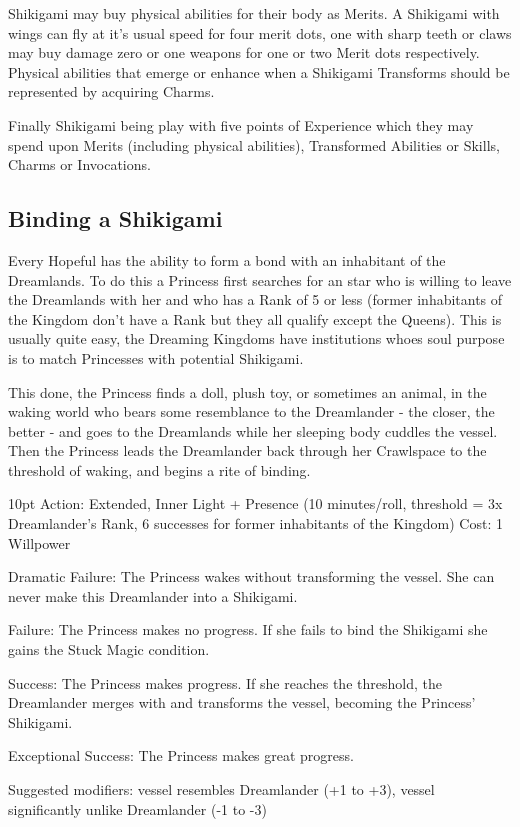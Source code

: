 Shikigami may buy physical abilities for their body as Merits. A Shikigami with wings can fly at it's usual speed for four merit dots, one with sharp teeth or claws may buy damage zero or one weapons for one or two Merit dots respectively. Physical abilities that emerge or enhance when a Shikigami Transforms should be represented by acquiring Charms. 

Finally Shikigami being play with five points of Experience which they may spend upon Merits (including physical abilities), Transformed Abilities or Skills, Charms or Invocations.

\subsection*{Binding a Shikigami}

Every Hopeful has the ability to form a bond with an inhabitant of the Dreamlands. To do this a Princess first searches for an star who is willing to leave the Dreamlands with her and who has a Rank of 5 or less (former inhabitants of the Kingdom don't have a Rank but they all qualify except the Queens). This is usually quite easy, the Dreaming Kingdoms have institutions whoes soul purpose is to match Princesses with potential Shikigami. 

This done, the Princess finds a doll, plush toy, or sometimes an animal, in the waking world who bears some resemblance to the Dreamlander - the closer, the better - and goes to the Dreamlands while her sleeping body cuddles the vessel. Then the Princess leads the Dreamlander back through her Crawlspace to the threshold of waking, and begins a rite of binding.

  \begin{myindentpar}{10pt}  Action: Extended, Inner Light + Presence (10 minutes/roll, threshold = 3x Dreamlander's Rank, 6 successes for former inhabitants of the Kingdom) 
    Cost: 1 Willpower 
    
    Dramatic Failure: The Princess wakes without transforming the vessel. She can never make this Dreamlander into a Shikigami.
    
    Failure: The Princess makes no progress. If she fails to bind the Shikigami she gains the Stuck Magic condition.
    
    Success: The Princess makes progress. If she reaches the threshold, the Dreamlander merges with and transforms the vessel, becoming the Princess' Shikigami. 
    
    Exceptional Success: The Princess makes great progress.
	
    Suggested modifiers: vessel resembles Dreamlander (+1 to +3), vessel significantly unlike Dreamlander (-1 to -3) \end{myindentpar}

